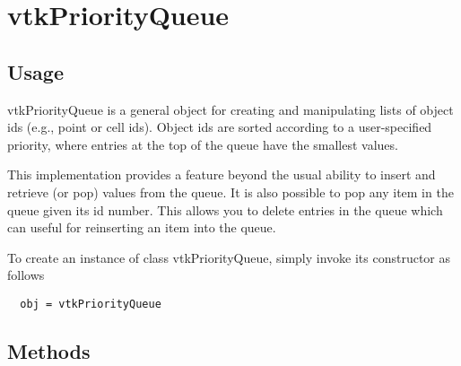 \section{vtkPriorityQueue}

\subsection{Usage}

 vtkPriorityQueue is a general object for creating and manipulating lists
 of object ids (e.g., point or cell ids). Object ids are sorted according
 to a user-specified priority, where entries at the top of the queue have
 the smallest values.

 This implementation provides a feature beyond the usual ability to insert
 and retrieve (or pop) values from the queue. It is also possible to
 pop any item in the queue given its id number. This allows you to delete
 entries in the queue which can useful for reinserting an item into the
 queue. 


To create an instance of class vtkPriorityQueue, simply
invoke its constructor as follows
\begin{verbatim}
  obj = vtkPriorityQueue
\end{verbatim}
\subsection{Methods}

